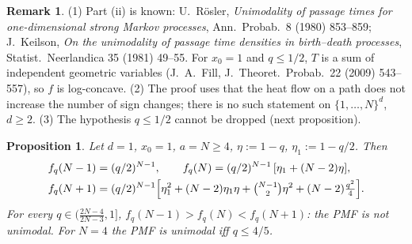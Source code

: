 \documentclass[11pt,a4paper]{article}
\newtheorem{proposition}[theorem]{Proposition}
\theoremstyle{definition}
\newtheorem*{remarku}{Remark}
\begin{document}
\begin{remarku}
(1) Part (ii) is known: U.~R\"osler, \emph{Unimodality of passage times for one-dimensional strong Markov processes}, Ann.\ Probab.\ 8 (1980) 853--859; J.~Keilson, \emph{On the unimodality of passage time densities in birth--death processes}, Statist.\ Neerlandica 35 (1981) 49--55. For $x_0=1$ and $q\le1/2$, $T$ is a sum of independent geometric variables (J.~A.~Fill, J.\ Theoret.\ Probab.\ 22 (2009) 543--557), so $f$ is log-concave. (2) The proof uses that the heat flow on a path does not increase the number of sign changes; there is no such statement on $\{1,\dots,N\}^d$, $d\ge2$. (3) The hypothesis $q\le1/2$ cannot be dropped (next proposition).
\end{remarku}

\begin{proposition}\label{prop:1dcounter}
Let $d=1$, $x_0=1$, $a=N\ge4$, $\eta:=1-q$, $\eta_1:=1-q/2$. Then
\begin{align*}
f_q(N-1)&=(q/2)^{N-1},\qquad f_q(N)=(q/2)^{N-1}\,[\eta_1+(N-2)\eta],\\
f_q(N+1)&=(q/2)^{N-1}\Bigl[\eta_1^2+(N-2)\eta_1\eta+\tbinom{N-1}2\eta^2+(N-2)\tfrac{q^2}4\Bigr].
\end{align*}
For every $q\in\bigl(\frac{2N-4}{2N-3},1\bigr]$, $f_q(N-1)>f_q(N)<f_q(N+1)$: the PMF is not unimodal. For $N=4$ the PMF is unimodal iff $q\le4/5$.
\end{proposition}
\end{document}
